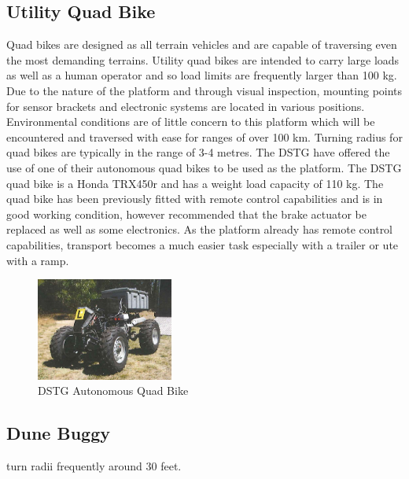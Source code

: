 \documentclass[main.tex]{subfiles}
\begin{document}
\subsection{Utility Quad Bike}
Quad bikes are designed as all terrain vehicles and are capable of traversing even the most demanding terrains. Utility quad bikes are intended to carry large loads as well as a human operator and so load limits are frequently larger than 100 kg. Due to the nature of the platform and through visual inspection, mounting points for sensor brackets and electronic systems are located in various positions.  Environmental conditions are of little concern to this platform which will be encountered and traversed with ease for ranges of over 100 km. Turning radius for quad bikes are typically in the range of 3-4 metres.
The DSTG have offered the use of one of their autonomous quad bikes to be used as the platform. The DSTG quad bike is a Honda TRX450r and has a weight load capacity of 110 kg. The quad bike has been previously fitted with remote control capabilities and is in good working condition, however \textcite{scheiner2011} recommended that the brake actuator be replaced as well as some electronics. As the platform already has remote control capabilities, transport becomes a much easier task especially with a trailer or ute with a ramp.
\begin{figure}[ht]
\includegraphics[width=0.4\textwidth]{4-ConceptDesign/2011quadbike.PNG}
\centering
\caption[DSTG Autonomous Quad Bike]{DSTG Autonomous Quad Bike \parencite{scheiner2011}} 
\end{figure}

\subsection{Dune Buggy}
turn radii frequently around 30 feet.
\end{document}
